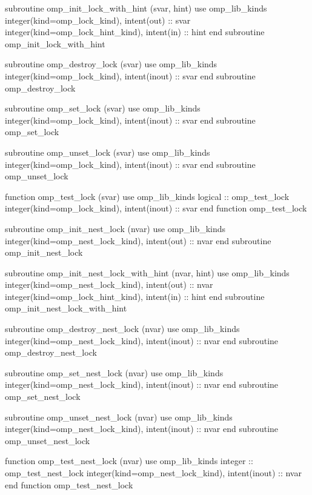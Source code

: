 {\begin{ompfFunction}
          subroutine omp_init_lock_with_hint (svar, hint)
           use omp_lib_kinds
           integer(kind=omp_lock_kind), intent(out) :: svar
           integer(kind=omp_lock_hint_kind), intent(in) :: hint
          end subroutine omp_init_lock_with_hint

          subroutine omp_destroy_lock (svar)
           use omp_lib_kinds
           integer(kind=omp_lock_kind), intent(inout) :: svar
          end subroutine omp_destroy_lock

          subroutine omp_set_lock (svar)
           use omp_lib_kinds
           integer(kind=omp_lock_kind), intent(inout) :: svar
          end subroutine omp_set_lock

          subroutine omp_unset_lock (svar)
           use omp_lib_kinds
           integer(kind=omp_lock_kind), intent(inout) :: svar
          end subroutine omp_unset_lock

          function omp_test_lock (svar)
           use omp_lib_kinds
           logical :: omp_test_lock
           integer(kind=omp_lock_kind), intent(inout) :: svar
          end function omp_test_lock

          subroutine omp_init_nest_lock (nvar)
           use omp_lib_kinds
           integer(kind=omp_nest_lock_kind), intent(out) :: nvar
          end subroutine omp_init_nest_lock

          subroutine omp_init_nest_lock_with_hint (nvar, hint)
           use omp_lib_kinds
           integer(kind=omp_nest_lock_kind), intent(out) :: nvar
           integer(kind=omp_lock_hint_kind), intent(in) :: hint
          end subroutine omp_init_nest_lock_with_hint

          subroutine omp_destroy_nest_lock (nvar)
           use omp_lib_kinds
           integer(kind=omp_nest_lock_kind), intent(inout) :: nvar
          end subroutine omp_destroy_nest_lock

          subroutine omp_set_nest_lock (nvar)
           use omp_lib_kinds
           integer(kind=omp_nest_lock_kind), intent(inout) :: nvar
          end subroutine omp_set_nest_lock

          subroutine omp_unset_nest_lock (nvar)
           use omp_lib_kinds
           integer(kind=omp_nest_lock_kind), intent(inout) :: nvar
          end subroutine omp_unset_nest_lock

          function omp_test_nest_lock (nvar)
           use omp_lib_kinds
           integer :: omp_test_nest_lock
           integer(kind=omp_nest_lock_kind), intent(inout) :: nvar
          end function omp_test_nest_lock


\end{ompfFunction}}

